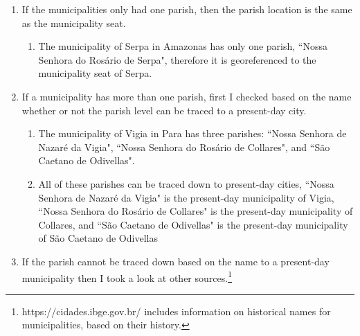\documentclass[11pt]{article}
\begin{document}
\begin{enumerate}
  \item If the municipalities only had one parish, then the parish location is the same as the municipality seat.
  \begin{enumerate}
    \item The municipality of Serpa in Amazonas has only one parish, ``Nossa Senhora do Rosário de Serpa", therefore it is georeferenced to the municipality seat of Serpa.
  \end{enumerate}
  \item If a municipality has more than one parish, first I checked based on the name whether or not the parish level can be traced to a present-day city.
  \begin{enumerate}
    \item The municipality of Vigia in Para has three parishes: ``Nossa Senhora de Nazaré da Vigia", ``Nossa Senhora do Rosário de Collares", and ``São Caetano de Odivellas". 
    \item All of these parishes can be traced down to present-day cities, ``Nossa Senhora de Nazaré da Vigia" is the present-day municipality of Vigia, ``Nossa Senhora do Rosário de Collares" is the present-day municipality of Collares, and ``São Caetano de Odivellas" is the present-day municipality of São Caetano de Odivellas
  \end{enumerate}
  \item If the parish cannot be traced down based on the name to a present-day municipality then I took a look at other sources.\footnote{https://cidades.ibge.gov.br/ includes information on historical names for municipalities, based on their history.}
\end{enumerate}

\clearpage


\end{document}
